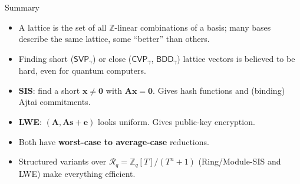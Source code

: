 \documentclass{zkdl-presentation-template}
\begin{document}
    \begin{frame}{Summary}
        \begin{itemize}
            \item A lattice is the set of all $\mathbb{Z}$-linear combinations of a basis; many bases describe the same lattice, some ``better'' than others.\pause
            \item Finding short ($\mathsf{SVP}_{\gamma}$) or close ($\mathsf{CVP}_{\gamma}$, $\mathsf{BDD}_{\gamma}$) lattice vectors is believed to be hard, even for quantum computers.\pause
            \item \textbf{SIS}: find a short $\mathbf{x} \neq \mathbf{0}$ with $\mathbf{A}\mathbf{x} = \mathbf{0}$. Gives hash functions and (binding) Ajtai commitments.\pause
            \item \textbf{LWE}: $(\mathbf{A},\mathbf{A}\mathbf{s}+\mathbf{e})$ looks uniform. Gives public-key encryption.\pause
            \item Both have \textbf{worst-case to average-case} reductions.\pause
            \item Structured variants over $\mathcal{R}_q = \mathbb{Z}_q[T]/(T^n+1)$ (Ring/Module-SIS and LWE) make everything efficient.
        \end{itemize}
    \end{frame}

    \makeclosingframe
\end{document}
